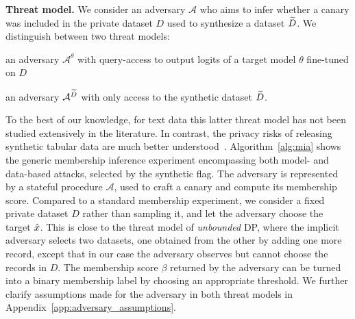 \textbf{Threat model.} 
We consider an adversary $\mathcal{A}$ who aims to infer whether a canary  was included in the private dataset $D$ used to synthesize a dataset ${\widetilde{D}}$. 
We distinguish between two threat models:
%
\begin{inlineenum}
\item an adversary $\mathcal{A}^\theta$ with query-access to output logits of a target model $\theta$ fine-tuned on $D$
%
\item an adversary $\mathcal{A}^{{\widetilde{D}}}$ with only access to the synthetic dataset ${\widetilde{D}}$.
\end{inlineenum}
%
To the best of our knowledge, for text data this latter threat model has not been studied extensively in the literature. 
In contrast, the privacy risks of releasing synthetic tabular data are much better understood~\citep{stadler2022synthetic,yale2019assessing,hyeong2022empirical,zhang2022membership}.
%
Algorithm~\ref{alg:mia} shows the generic membership inference experiment encompassing both model- and data-based attacks, selected by the \textsf{synthetic} flag. The adversary is represented by a stateful procedure $\mathcal{A}$, used to craft a canary and compute its membership score.
%
Compared to a standard membership experiment, we consider a fixed private dataset $D$ rather than sampling it, and let the adversary choose the target ${\hat{x}}$. This is close to the threat model of \emph{unbounded} DP, where the implicit adversary selects two datasets, one obtained from the other by adding one more record, except that in our case the adversary observes but cannot choose the records in $D$. The membership score $\beta$ returned by the adversary can be turned into a binary membership label by choosing an appropriate threshold. We further clarify assumptions made for the adversary in both threat models in Appendix~\ref{app:adversary_assumptions}.

